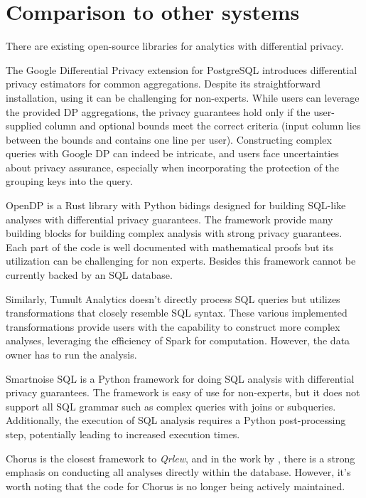 \documentclass[letterpaper]{article} %
\newcommand{\qrlew}{\emph{Qrlew}}
\begin{document}
\section{Comparison to other systems}

There are existing open-source libraries for analytics with differential privacy.


The Google Differential Privacy extension for PostgreSQL introduces differential privacy estimators for common aggregations.
Despite its straightforward installation, using it can be challenging for non-experts.
While users can leverage the provided DP aggregations,
the privacy guarantees hold only if the user-supplied column and optional bounds meet the correct criteria (input column lies between the bounds and contains one line per user).
Constructing complex queries with Google DP can indeed be intricate, and users face uncertainties about privacy assurance,
especially when incorporating the protection of the grouping keys into the query.

OpenDP is a Rust library with Python bidings designed for building SQL-like analyses with differential privacy guarantees.
The framework provide many building blocks for building complex analysis with strong privacy guarantees.
Each part of the code is well documented with mathematical proofs but
its utilization can be challenging for non experts.
Besides this framework cannot be currently backed by an SQL database.

Similarly, Tumult Analytics doesn't directly process SQL queries but utilizes transformations that closely resemble SQL syntax.
These various implemented transformations provide users with the capability to construct more complex analyses,
leveraging the efficiency of Spark for computation.
However, the data owner has to run the analysis.

Smartnoise SQL is a Python framework for doing SQL analysis with differential privacy guarantees.
The framework is easy of use for non-experts, but it does not support all SQL grammar such as complex queries with joins or subqueries.
Additionally, the execution of SQL analysis requires a Python post-processing step, potentially leading to increased execution times.

Chorus is the closest framework to \qrlew, and in the work by \citeauthor{johnson2020chorus},
there is a strong emphasis on conducting all analyses directly within the database.
However, it's worth noting that the code for Chorus is no longer being actively maintained.
\end{document}
